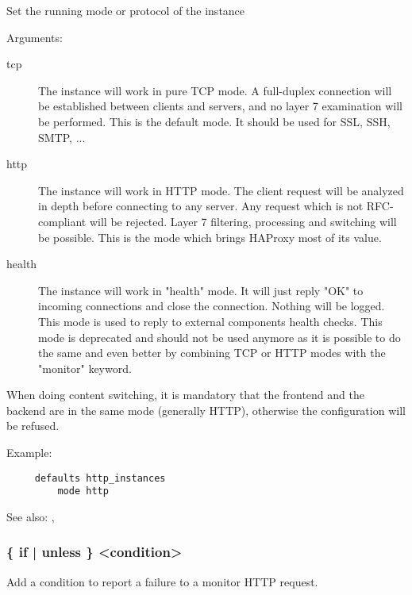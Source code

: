   Set the running mode or protocol of the instance


  Arguments:
\begin{description}
\item[tcp]
              The instance will work in pure TCP mode. A full-duplex connection
              will be established between clients and servers, and no layer 7
              examination will be performed. This is the default mode. It
              should be used for SSL, SSH, SMTP, ...

\item[http]
              The instance will work in HTTP mode. The client request will be
              analyzed in depth before connecting to any server. Any request
              which is not RFC-compliant will be rejected. Layer 7 filtering,
              processing and switching will be possible. This is the mode which
              brings HAProxy most of its value.

\item[health]
              The instance will work in "health" mode. It will just reply "OK"
              to incoming connections and close the connection. Nothing will be
              logged. This mode is used to reply to external components health
              checks. This mode is deprecated and should not be used anymore as
              it is possible to do the same and even better by combining TCP or
              HTTP modes with the "monitor" keyword.
\end{description}

  When doing content switching, it is mandatory that the frontend and the
  backend are in the same mode (generally HTTP), otherwise the configuration
  will be refused.

  Example:
\begin{verbatim}
     defaults http_instances
         mode http
\end{verbatim}


See also: , 

\subsubsection[monitor fail]{ \{ if | unless \} <condition>}

  Add a condition to report a failure to a monitor HTTP request.


